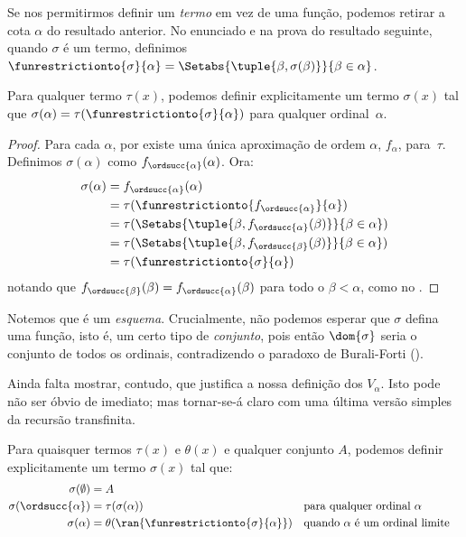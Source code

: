 \documentclass[../../../include/open-logic-section]{subfiles}
\begin{document}
Se nos permitirmos definir um \emph{termo} em vez de uma função,
podemos retirar a cota $\alpha$ do resultado anterior. No
enunciado e na prova do resultado seguinte, quando $\sigma$ é um termo,
definimos $\funrestrictionto{\sigma}{\alpha} = \Setabs{\tuple{\beta,
\sigma(\beta)}}{\beta \in \alpha}$.

\begin{thm}
Para qualquer termo $\tau(x)$, podemos definir explicitamente um termo
$\sigma(x)$ tal que
$\sigma(\alpha) = \tau(\funrestrictionto{\sigma}{\alpha})$ para qualquer
ordinal~$\alpha$.
\end{thm}

\begin{proof}
Para cada $\alpha$, por  existe uma única aproximação de ordem $\alpha$, $f_\alpha$, para~$\tau$. Definimos $\sigma(\alpha)$ como $f_{\ordsucc{\alpha}}(\alpha)$. Ora:
	\begin{align*}
		\sigma(\alpha) &= 
		f_{\ordsucc{\alpha}}(\alpha) \\&= 
		\tau(\funrestrictionto{f_{\ordsucc{\alpha}}}{\alpha}) \\&= 
		\tau(\Setabs{\tuple{\beta, f_{\ordsucc{\alpha}}(\beta)}}{\beta \in \alpha}) \\&= 
		\tau(\Setabs{\tuple{\beta, f_{\ordsucc{\beta}}(\beta)}}{\beta \in \alpha})\\&=
		\tau(\funrestrictionto{\sigma}{\alpha})
	\end{align*}
notando que $f_{\ordsucc{\beta}}(\beta) = f_{\ordsucc{\alpha}}(\beta)$ para todo o $\beta < \alpha$, como no . 
\end{proof}
\noindent 
Notemos que  é um \emph{esquema}. Crucialmente, não podemos
esperar que $\sigma$ defina uma função, isto é, um certo tipo de
\emph{conjunto}, pois então $\dom{\sigma}$ seria o conjunto de todos os
ordinais, contradizendo o paradoxo de Burali-Forti
().

Ainda falta mostrar, contudo, que 
justifica a nossa definição dos $V_\alpha$. Isto pode não ser
óbvio de imediato; mas tornar-se-á claro com uma última versão simples
da recursão transfinita.

\begin{thm} 
Para quaisquer termos $\tau(x)$ e $\theta(x)$ e qualquer conjunto $A$, podemos
definir explicitamente um termo $\sigma(x)$ tal que:
\begin{align*}
	\sigma(\emptyset) &= A\\
	\sigma(\ordsucc{\alpha}) &= \tau(\sigma(\alpha)) &&
		\text{para qualquer ordinal }\alpha\\
	\sigma(\alpha) &= \theta(\ran{\funrestrictionto{\sigma}{\alpha}})&&
	\text{quando }\alpha\text{ é um ordinal limite}
\end{align*}
\end{thm}
\end{document}
